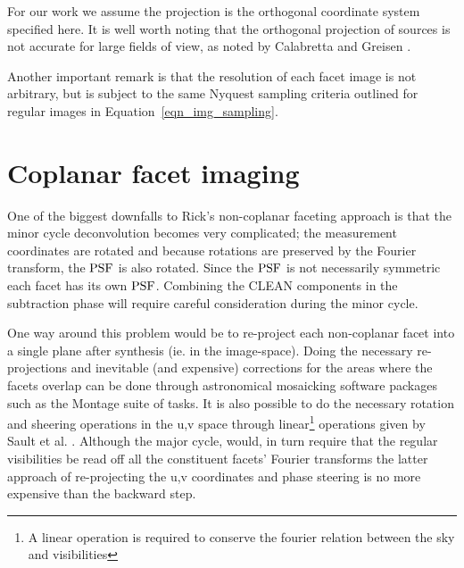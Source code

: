 For our work we assume the projection is the orthogonal coordinate system specified here. It is well worth noting 
that the orthogonal projection of sources is not accurate for large fields of view, as noted by Calabretta and Greisen 
\cite{calabretta2002representations}.

Another important remark is that the resolution of each facet image is not arbitrary, but is subject to the same Nyquest sampling 
criteria outlined for regular images in Equation~\ref{eqn_img_sampling}.
\section{Coplanar facet imaging}
One of the biggest downfalls to Rick's non-coplanar faceting approach is that the minor cycle deconvolution becomes very complicated; the measurement
coordinates are rotated and because rotations are preserved by the Fourier transform, the $\textrm{PSF}$ is also rotated. Since the $\textrm{PSF}$ is not necessarily 
symmetric each facet has its own $\textrm{PSF}$. Combining the CLEAN components in the subtraction phase will require careful consideration during the minor cycle.

One way around this problem would be to re-project each non-coplanar facet into a single plane after synthesis (ie. in the image-space). Doing the necessary
re-projections and inevitable (and expensive) corrections for the areas where the facets overlap can be done through astronomical mosaicking software packages such as the
Montage \cite{jacob2004montage} suite of tasks. It is also possible to do the necessary rotation and sheering operations in the u,v space through 
linear\footnote{A linear operation is required to conserve the fourier relation between the sky and visibilities} operations given by 
Sault et al. \cite[Appendix A]{sault1996approach}. Although the major cycle, would, in turn require that the regular visibilities be read off all
the constituent facets' Fourier transforms the latter approach of re-projecting the u,v coordinates and phase steering is no more expensive than the backward 
step.

